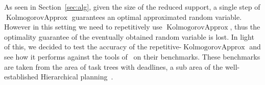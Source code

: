 \documentclass{article}
\DeclareMathOperator{\KlmApprox}{KolmogorovApprox}
\begin{document}
	As seen in Section~\ref{sec:alg}, given the size of the reduced support, a single step of $\KlmApprox$ guarantees an optimal approximated random variable. However in this setting we need to repetitively use $\KlmApprox$, thus the optimality guarantee of the eventually obtained random variable is lost. In light of this, we decided to test the accuracy of the repetitive-$\KlmApprox$ and see how it performs against the tools of~\cite{cohen2015estimating,CohenGW18} on their benchmarks. These benchmarks are taken from the area of task trees with deadlines, a sub area of the well-established Hierarchical planning~\cite{thomas1988hierarchical, alford2016hierarchical, xiao2017hierarchical}.
	
	
	
	
\end{document}
